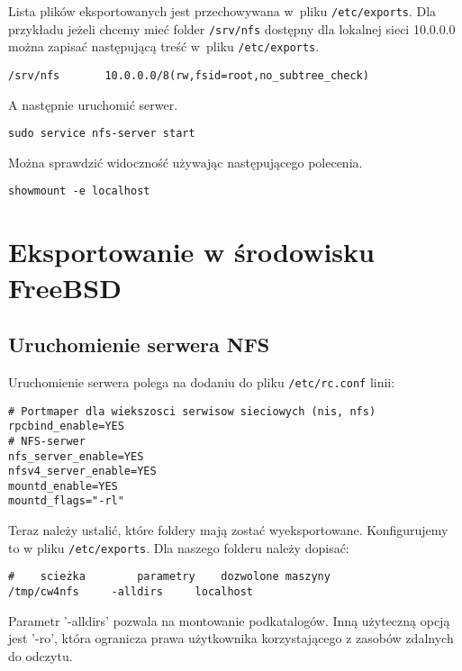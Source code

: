 \documentclass[a4paper,11pt]{article}
\begin{document}
Lista plików eksportowanych jest przechowywana w~pliku \verb|/etc/exports|.
Dla przykładu jeżeli chcemy mieć folder \verb|/srv/nfs| dostępny dla lokalnej
sieci 10.0.0.0 można zapisać następującą treść w~pliku \verb|/etc/exports|.

\begin{verbatim}
/srv/nfs       10.0.0.0/8(rw,fsid=root,no_subtree_check)
\end{verbatim}

A następnie uruchomić serwer.

\begin{verbatim}
sudo service nfs-server start
\end{verbatim}

Można sprawdzić widoczność używając następującego polecenia.

\begin{verbatim}
showmount -e localhost
\end{verbatim}


\section{Eksportowanie w środowisku FreeBSD}





\subsection{Uruchomienie serwera NFS}
Uruchomienie serwera polega na dodaniu do pliku \texttt{/etc/rc.conf} linii:

\footnotesize\begin{verbatim}
# Portmaper dla wiekszosci serwisow sieciowych (nis, nfs)
rpcbind_enable=YES		       
# NFS-serwer
nfs_server_enable=YES	    
nfsv4_server_enable=YES        
mountd_enable=YES		        
mountd_flags="-rl"		       
\end{verbatim}\normalsize

Teraz należy ustalić, które foldery mają zostać wyeksportowane. Konfigurujemy to w pliku \texttt{/etc/exports}. Dla naszego folderu należy dopisać:
\footnotesize\begin{verbatim}
#    scieżka        parametry    dozwolone maszyny
/tmp/cw4nfs     -alldirs     localhost
\end{verbatim}\normalsize
Parametr '-alldirs' pozwala na montowanie podkatalogów. Inną użyteczną opcją jest '-ro', która ogranicza prawa użytkownika korzystającego z zasobów zdalnych do odczytu.
\end{document}
